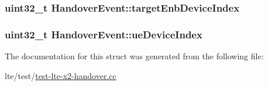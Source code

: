\subsubsection[{\texorpdfstring{target\+Enb\+Device\+Index}{targetEnbDeviceIndex}}]{\setlength{\rightskip}{0pt plus 5cm}uint32\+\_\+t Handover\+Event\+::target\+Enb\+Device\+Index}\hypertarget{structHandoverEvent_a2c869bb0b63b95b0285d3dfca98f81e7}{}\label{structHandoverEvent_a2c869bb0b63b95b0285d3dfca98f81e7}
\subsubsection[{\texorpdfstring{ue\+Device\+Index}{ueDeviceIndex}}]{\setlength{\rightskip}{0pt plus 5cm}uint32\+\_\+t Handover\+Event\+::ue\+Device\+Index}\hypertarget{structHandoverEvent_a0a353020e6276c4e900aa767354e3963}{}\label{structHandoverEvent_a0a353020e6276c4e900aa767354e3963}


The documentation for this struct was generated from the following file\+:\begin{DoxyCompactItemize}
\item 
lte/test/\hyperlink{test-lte-x2-handover_8cc}{test-\/lte-\/x2-\/handover.\+cc}\end{DoxyCompactItemize}

